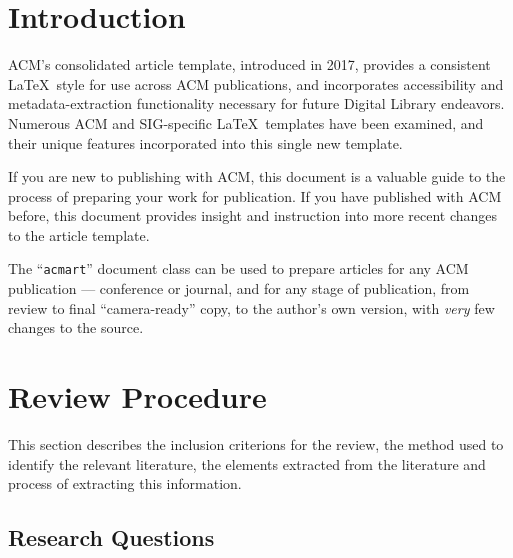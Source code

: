 \documentclass[acmsmall]{acmart}
\begin{document}



\maketitle

\section{Introduction}
ACM's consolidated article template, introduced in 2017, provides a
consistent \LaTeX\ style for use across ACM publications, and
incorporates accessibility and metadata-extraction functionality
necessary for future Digital Library endeavors. Numerous ACM and
SIG-specific \LaTeX\ templates have been examined, and their unique
features incorporated into this single new template.

If you are new to publishing with ACM, this document is a valuable
guide to the process of preparing your work for publication. If you
have published with ACM before, this document provides insight and
instruction into more recent changes to the article template.

The ``\verb|acmart|'' document class can be used to prepare articles
for any ACM publication --- conference or journal, and for any stage
of publication, from review to final ``camera-ready'' copy, to the
author's own version, with {\itshape very} few changes to the source.


\cite{tavallaee2009detailed}


\section{Review Procedure}
This section describes the inclusion criterions for the review, the method used to identify the relevant literature, the elements extracted from the literature and process of extracting this information.


\subsection{Research Questions}
\end{document}

